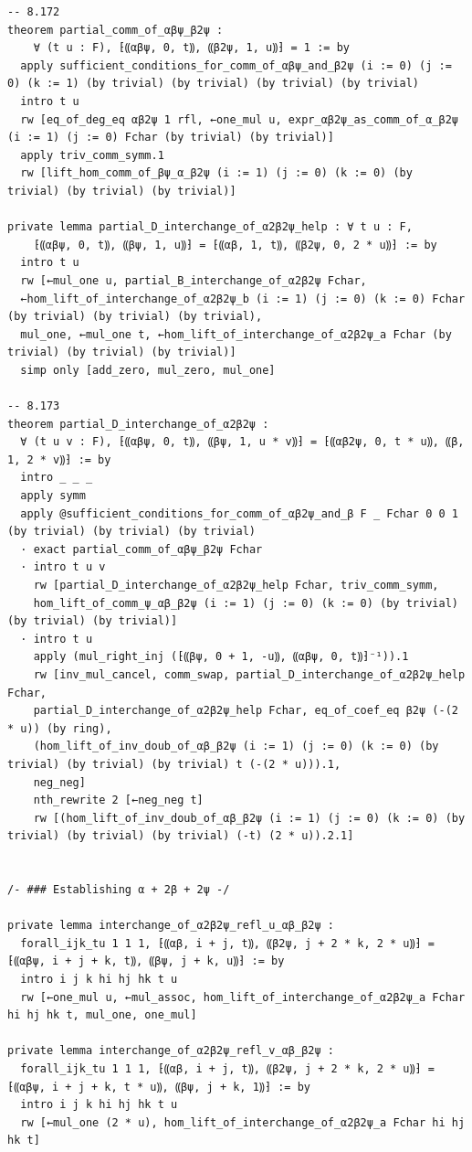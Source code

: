 \begin{Verbatim}
-- 8.172
theorem partial_comm_of_αβψ_β2ψ :
    ∀ (t u : F), ⁅⸨αβψ, 0, t⸩, ⸨β2ψ, 1, u⸩⁆ = 1 := by
  apply sufficient_conditions_for_comm_of_αβψ_and_β2ψ (i := 0) (j := 0) (k := 1) (by trivial) (by trivial) (by trivial) (by trivial)
  intro t u
  rw [eq_of_deg_eq αβ2ψ 1 rfl, ←one_mul u, expr_αβ2ψ_as_comm_of_α_β2ψ (i := 1) (j := 0) Fchar (by trivial) (by trivial)]
  apply triv_comm_symm.1
  rw [lift_hom_comm_of_βψ_α_β2ψ (i := 1) (j := 0) (k := 0) (by trivial) (by trivial) (by trivial)]

private lemma partial_D_interchange_of_α2β2ψ_help : ∀ t u : F,
    ⁅⸨αβψ, 0, t⸩, ⸨βψ, 1, u⸩⁆ = ⁅⸨αβ, 1, t⸩, ⸨β2ψ, 0, 2 * u⸩⁆ := by
  intro t u
  rw [←mul_one u, partial_B_interchange_of_α2β2ψ Fchar,
  ←hom_lift_of_interchange_of_α2β2ψ_b (i := 1) (j := 0) (k := 0) Fchar (by trivial) (by trivial) (by trivial),
  mul_one, ←mul_one t, ←hom_lift_of_interchange_of_α2β2ψ_a Fchar (by trivial) (by trivial) (by trivial)]
  simp only [add_zero, mul_zero, mul_one]

-- 8.173
theorem partial_D_interchange_of_α2β2ψ :
  ∀ (t u v : F), ⁅⸨αβψ, 0, t⸩, ⸨βψ, 1, u * v⸩⁆ = ⁅⸨αβ2ψ, 0, t * u⸩, ⸨β, 1, 2 * v⸩⁆ := by
  intro _ _ _
  apply symm
  apply @sufficient_conditions_for_comm_of_αβ2ψ_and_β F _ Fchar 0 0 1 (by trivial) (by trivial) (by trivial)
  · exact partial_comm_of_αβψ_β2ψ Fchar
  · intro t u v
    rw [partial_D_interchange_of_α2β2ψ_help Fchar, triv_comm_symm,
    hom_lift_of_comm_ψ_αβ_β2ψ (i := 1) (j := 0) (k := 0) (by trivial) (by trivial) (by trivial)]
  · intro t u
    apply (mul_right_inj (⁅⸨βψ, 0 + 1, -u⸩, ⸨αβψ, 0, t⸩⁆⁻¹)).1
    rw [inv_mul_cancel, comm_swap, partial_D_interchange_of_α2β2ψ_help Fchar,
    partial_D_interchange_of_α2β2ψ_help Fchar, eq_of_coef_eq β2ψ (-(2 * u)) (by ring),
    (hom_lift_of_inv_doub_of_αβ_β2ψ (i := 1) (j := 0) (k := 0) (by trivial) (by trivial) (by trivial) t (-(2 * u))).1,
    neg_neg]
    nth_rewrite 2 [←neg_neg t]
    rw [(hom_lift_of_inv_doub_of_αβ_β2ψ (i := 1) (j := 0) (k := 0) (by trivial) (by trivial) (by trivial) (-t) (2 * u)).2.1]


/- ### Establishing α + 2β + 2ψ -/

private lemma interchange_of_α2β2ψ_refl_u_αβ_β2ψ :
  forall_ijk_tu 1 1 1, ⁅⸨αβ, i + j, t⸩, ⸨β2ψ, j + 2 * k, 2 * u⸩⁆ = ⁅⸨αβψ, i + j + k, t⸩, ⸨βψ, j + k, u⸩⁆ := by
  intro i j k hi hj hk t u
  rw [←one_mul u, ←mul_assoc, hom_lift_of_interchange_of_α2β2ψ_a Fchar hi hj hk t, mul_one, one_mul]

private lemma interchange_of_α2β2ψ_refl_v_αβ_β2ψ :
  forall_ijk_tu 1 1 1, ⁅⸨αβ, i + j, t⸩, ⸨β2ψ, j + 2 * k, 2 * u⸩⁆ = ⁅⸨αβψ, i + j + k, t * u⸩, ⸨βψ, j + k, 1⸩⁆ := by
  intro i j k hi hj hk t u
  rw [←mul_one (2 * u), hom_lift_of_interchange_of_α2β2ψ_a Fchar hi hj hk t]


\end{Verbatim}
